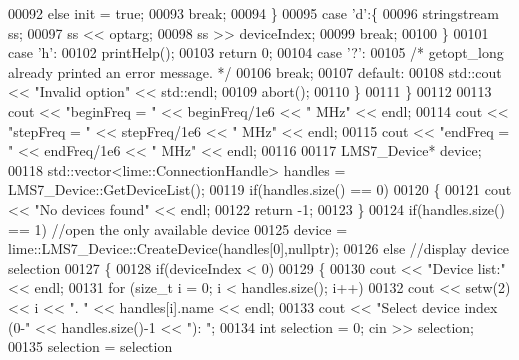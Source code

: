 \begin{DoxyCode}
00092             \textcolor{keywordflow}{else} init = \textcolor{keyword}{true};
00093             \textcolor{keywordflow}{break};
00094         \}
00095         \textcolor{keywordflow}{case} \textcolor{charliteral}{'d'}:\{
00096             stringstream ss;
00097             ss << optarg;
00098             ss >> deviceIndex;
00099             \textcolor{keywordflow}{break};
00100         \}
00101         \textcolor{keywordflow}{case} \textcolor{charliteral}{'h'}:
00102             printHelp();
00103             \textcolor{keywordflow}{return} 0;
00104         \textcolor{keywordflow}{case} \textcolor{charliteral}{'?'}:
00105             \textcolor{comment}{/* getopt\_long already printed an error message. */}
00106             \textcolor{keywordflow}{break};
00107         \textcolor{keywordflow}{default}:
00108             std::cout << \textcolor{stringliteral}{"Invalid option"} << std::endl;
00109             abort();
00110         \}
00111     \}
00112 
00113     cout << \textcolor{stringliteral}{"beginFreq = "} << beginFreq/1e6 << \textcolor{stringliteral}{" MHz"} << endl;
00114     cout << \textcolor{stringliteral}{"stepFreq  = "} << stepFreq/1e6 << \textcolor{stringliteral}{" MHz"} << endl;
00115     cout << \textcolor{stringliteral}{"endFreq   = "} << endFreq/1e6 << \textcolor{stringliteral}{" MHz"} << endl;
00116 
00117     LMS7_Device* device;
00118     std::vector<lime::ConnectionHandle> handles = LMS7\_Device::GetDeviceList();
00119     \textcolor{keywordflow}{if}(handles.size() == 0)
00120     \{
00121         cout << \textcolor{stringliteral}{"No devices found"} << endl;
00122         \textcolor{keywordflow}{return} -1;
00123     \}
00124     \textcolor{keywordflow}{if}(handles.size() == 1) \textcolor{comment}{//open the only available device}
00125         device = lime::LMS7_Device::CreateDevice(handles[0],\textcolor{keyword}{nullptr});
00126     \textcolor{keywordflow}{else} \textcolor{comment}{//display device selection}
00127     \{
00128         \textcolor{keywordflow}{if}(deviceIndex < 0)
00129         \{
00130             cout << \textcolor{stringliteral}{"Device list:"} << endl;
00131             \textcolor{keywordflow}{for} (\textcolor{keywordtype}{size\_t} i = 0; i < handles.size(); i++)
00132                cout << setw(2) << i << \textcolor{stringliteral}{". "} << handles[i].name << endl;
00133             cout << \textcolor{stringliteral}{"Select device index (0-"} << handles.size()-1 << \textcolor{stringliteral}{"): "};
00134             \textcolor{keywordtype}{int} selection = 0; cin >> selection;
00135             selection = selection %

\end{DoxyCode}
